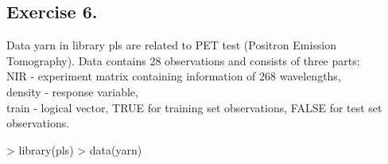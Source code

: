 \documentclass[a4paper]{article}
\begin{document}
\subsection{Exercise 6.} Data yarn in library pls are related to PET test
(Positron Emission Tomography). Data contains 28 observations and consists of
three parts:\\ 
NIR - experiment matrix containing information of 268 wavelengths,\\
density - response variable,\\
train - logical vector, TRUE for training set observations, FALSE for test set
observations.\\
\begin{Schunk}
\begin{Sinput}
> library(pls)
> data(yarn)
\end{Sinput}
\end{Schunk}
\end{document}
